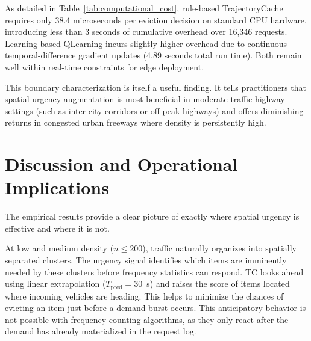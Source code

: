 \documentclass[preprint,12pt]{elsarticle}
\begin{document}
	\begin{table}[htbp]
		\centering
		\caption{Wall-Clock Execution Overhead: Rule-Based Scoring vs. Learning-Based Value Updates.}
		\label{tab:computational_cost}
		\small
	\end{table}
	
	\begin{hlblock}
	As detailed in Table~\ref{tab:computational_cost}, rule-based TrajectoryCache requires only 38.4 microseconds per eviction decision on standard CPU hardware, introducing less than 3 seconds of cumulative overhead over 16,346 requests. Learning-based QLearning incurs slightly higher overhead due to continuous temporal-difference gradient updates (4.89 seconds total run time). Both remain well within real-time constraints for edge deployment.
	\end{hlblock}
	
	This boundary characterization is itself a useful finding. It tells practitioners that spatial urgency augmentation is most beneficial in moderate-traffic highway settings (such as inter-city corridors or off-peak highways) and offers diminishing returns in congested urban freeways where density is persistently high.
	
	\section{Discussion and Operational Implications}

	\label{sec:discussion}
	
	The empirical results provide a clear picture of exactly where spatial urgency is effective and where it is not. 
	
	At low and medium density ($n \leq 200$), traffic naturally organizes into spatially separated clusters. The urgency signal identifies which items are imminently needed by these clusters before frequency statistics can respond. TC looks ahead using linear extrapolation ($T_\text{pred} = 30$~s) and raises the score of items located where incoming vehicles are heading. This helps to minimize the chances of evicting an item just before a demand burst occurs. This anticipatory behavior is not possible with frequency-counting algorithms, as they only react after the demand has already materialized in the request log.
	
\end{document}
